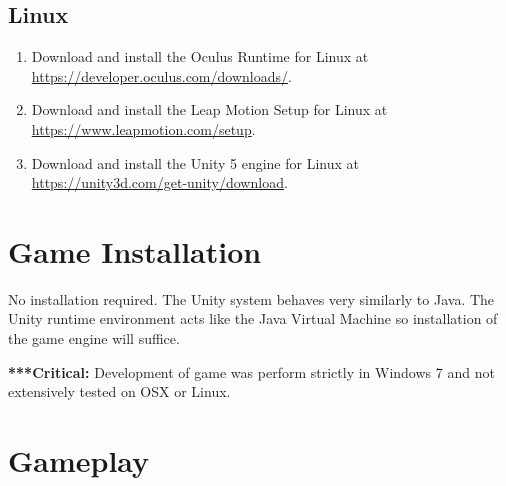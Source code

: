 \documentclass[a4paper]{refart}
\begin{document}
\subsection{Linux}

\begin{enumerate}
	\item Download and install the Oculus Runtime for Linux at\\ \url{https://developer.oculus.com/downloads/}.
	\item Download and install the Leap Motion Setup for Linux at\\ \url{https://www.leapmotion.com/setup}.
	\item Download and install the Unity 5 engine for Linux at\\ \url{https://unity3d.com/get-unity/download}.
\end{enumerate}

\pagebreak

\section{Game Installation}

No installation required. The Unity system behaves very similarly to Java. The Unity runtime environment acts like the Java Virtual Machine so installation of the game engine will suffice. 

\textbf{***Critical:} Development of game was perform strictly in Windows 7 and not extensively tested on OSX or Linux.

\section{Gameplay}
\end{document}
